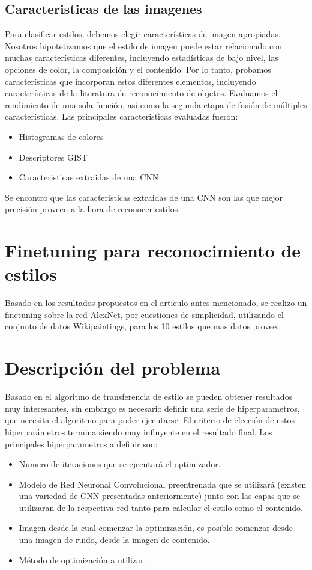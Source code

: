 \documentclass[a4paper,11pt,spanish]{book}
\begin{document}
    \subsection{Caracteristicas de las imagenes}
	Para clasificar estilos, debemos elegir características de imagen apropiadas. Nosotros hipotetizamos que el estilo de imagen puede estar relacionado con muchas características diferentes, 
	incluyendo estadísticas de bajo nivel, las opciones de color, la composición y el contenido. Por lo tanto, probamos características que incorporan estos diferentes elementos, incluyendo características de la 
	literatura de reconocimiento de objetos. Evaluamos el rendimiento de una sola función, así como la segunda etapa de fusión de múltiples características.
	Las principales caracteristicas evaluadas fueron:
	\begin{itemize}
	 \item Histogramas de colores
	 \item Descriptores GIST
	 \item Caracteristicas extraidas de una CNN
	\end{itemize}
	Se encontro que las caracteristicas extraidas de una CNN son las que mejor precisión proveen a la hora de reconocer estilos.

  \section{Finetuning para reconocimiento de estilos}
    Basado en los resultados propuestos en el articulo antes mencionado, se realizo un finetuning sobre la red AlexNet, por cuestiones de simplicidad, utilizando
    el conjunto de datos Wikipaintings, para los 10 estilos que mas datos provee.

    
  \section{Descripción del problema}
    Basado en el algoritmo de transferencia de estilo se pueden obtener resultados muy interesantes, sin embargo es necesario definir una serie de hiperparametros,
    que necesita el algoritmo para poder ejecutarse. El criterio de elección de estos hiperparámetros termina siendo muy influyente en el resultado final. 
    Los principales hiperparametros a definir son:
    \begin{itemize}
      \item Numero de iteraciones que se ejecutará el optimizador.
      \item Modelo de Red Neuronal Convolucional preentrenada que se utilizará (existen una variedad de CNN presentadas anteriormente) junto con las capas que se utilizaran de la 
      respectiva red tanto para calcular el estilo como el contenido.
      \item Imagen desde la cual comenzar la optimización, es posible comenzar desde una imagen de ruido, desde la imagen de contenido.
      \item Método de optimización a utilizar.
    \end{itemize}
\end{document}
